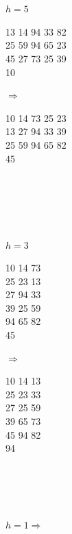 \begin{frame}[label=main]
	\\
	\ \\\pause
	{\color<3->{gray}
		$h = 5$\hspace{10mm}
		\begin{minipage}{.3\textwidth}
			13 14 94 33 82\\
			25 59 94 65 23\\
			45 27 73 25 39\\
			10
		\end{minipage}
		$\Rightarrow$\hspace{10mm}
		\begin{minipage}{.3\textwidth}
			10 14 73 25 23\\
			13 27 94 33 39\\
			25 59 94 65 82\\
			45
		\end{minipage}
	}
	\\\ \\\pause
	\\
	\ \\\pause
	{\color<5->{gray}
			$h = 3$\hspace{10mm}
		\begin{minipage}{.3\textwidth}
			10 14 73\\
			25 23 13\\
			27 94 33\\
			39 25 59\\
			94 65 82\\
			45
		\end{minipage}
		$\Rightarrow$\hspace{10mm}
		\begin{minipage}{.3\textwidth}
			10 14 13\\
			25 23 33\\
			27 25 59\\
			39 65 73\\
			45 94 82\\
			94
		\end{minipage}
	}
	\\\ \\\pause
	\\
	\ \\
	$h = 1 \Rightarrow$ 
\end{frame}

